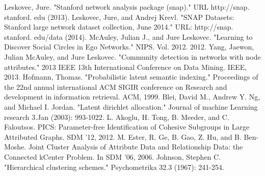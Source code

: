 \documentclass[11pt]{article}
\begin{document}
\begin{thebibliography}{3}
Leskovec, Jure. "Stanford network analysis package (snap)." URL http://snap. stanford. edu (2013).
Leskovec, Jure, and Andrej Krevl. "SNAP Datasets: Stanford large network dataset collection, June 2014." URL: http://snap. stanford. edu/data (2014).
McAuley, Julian J., and Jure Leskovec. "Learning to Discover Social Circles in Ego Networks." NIPS. Vol. 2012. 2012.
Yang, Jaewon, Julian McAuley, and Jure Leskovec. "Community detection in networks with node attributes." 2013 IEEE 13th International Conference on Data Mining. IEEE, 2013.
Hofmann, Thomas. "Probabilistic latent semantic indexing." Proceedings of the 22nd annual international ACM SIGIR conference on Research and development in information retrieval. ACM, 1999.
Blei, David M., Andrew Y. Ng, and Michael I. Jordan. "Latent dirichlet allocation." Journal of machine Learning research 3.Jan (2003): 993-1022.
 L. Akoglu, H. Tong, B. Meeder, and C. Faloutsos. PICS: Parameter-free
Identification of Cohesive Subgroups in Large Attributed Graphs. SDM
’12, 2012.
M. Ester, R. Ge, B. Gao, Z. Hu, and B. Ben-Moshe. Joint Cluster
Analysis of Attribute Data and Relationship Data: the Connected kCenter
Problem. In SDM ’06, 2006.
Johnson, Stephen C. "Hierarchical clustering schemes." Psychometrika 32.3 (1967): 241-254.
\end{thebibliography}
\end{document}
